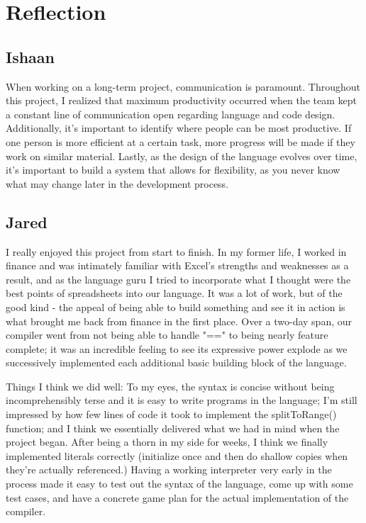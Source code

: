\chapter{Reflection}

\section{Ishaan}
When working on a long-term project, communication is paramount. Throughout this project, I realized that maximum productivity occurred when the team kept a constant line of communication open regarding language and code design.
Additionally, it's important to identify where people can be most productive. If one person is more efficient at a certain task, more progress will be made if they work on similar material.
Lastly, as the design of the language evolves over time, it's important to build a system that allows for flexibility, as you never know what may change later in the development process.

\section{Jared}
I really enjoyed this project from start to finish. In my former life, I worked in finance and was intimately familiar with Excel's strengths and weaknesses as a result, and as the language guru I tried to incorporate what I thought were the best points of spreadsheets into our language. It was a lot of work, but of the good kind - the appeal of being able to build something and see it in action is what brought me back from finance in the first place. Over a two-day span, our compiler went from not being able to handle "==" to being nearly feature complete; it was an incredible feeling to see its expressive power explode as we successively implemented each additional basic building block of the language.

Things I think we did well: To my eyes, the syntax is concise without being incomprehensibly terse and it is easy to write programs in the language; I'm still impressed by how few lines of code it took to implement the splitToRange() function; and I think we essentially delivered what we had in mind when the project began. After being a thorn in my side for weeks, I think we finally implemented literals correctly (initialize once and then do shallow copies when they're actually referenced.) Having a working interpreter very early in the process made it easy to test out the syntax of the language, come up with some test cases, and have a concrete game plan for the actual implementation of the compiler.

